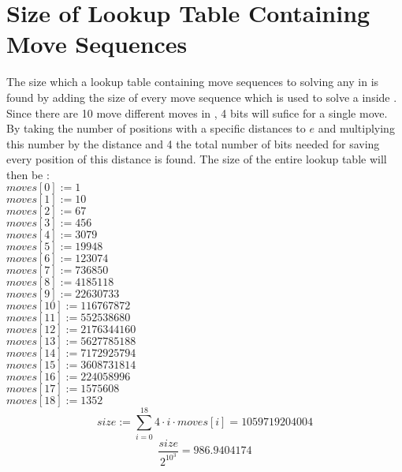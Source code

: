 \chapter{Size of Lookup Table Containing Move Sequences}
\label{chap:sizeOfLookUp}
\emptyTop{}
The size which a lookup table containing move sequences to solving any \cube{} in  is found by adding the size of every move sequence which is used to solve a \cube{} inside .
Since there are 10 move different moves in , 4 bits will sufice for a single move.
By taking the number of positions with a specific distances to $e$ and multiplying this number by the distance and 4 the total number of bits needed for saving every position of this distance is found.
The size of the entire lookup table will then be \cite{rokicki09}: \\
$moves[0] := 1$ \\
$moves[1] := 10$ \\
$moves[2] := 67$ \\
$moves[3] := 456$ \\
$moves[4] := 3079$ \\
$moves[5] := 19948$ \\
$moves[6] := 123074$ \\
$moves[7] := 736850$ \\
$moves[8] := 4185118$ \\
$moves[9] := 22630733$ \\
$moves[10] := 116767872$ \\
$moves[11] := 552538680$ \\
$moves[12] := 2176344160$ \\
$moves[13] := 5627785188$ \\
$moves[14] := 7172925794$ \\
$moves[15] := 3608731814$ \\
$moves[16] := 224058996$ \\
$moves[17] := 1575608$ \\
$moves[18] := 1352$ \\
\[ size := \sum_{i=0}^{18} 4 \cdot i \cdot moves[i] = 1059719204004\]
\[ \frac{size}{2^{10^3}} = 986.9404174 \]
